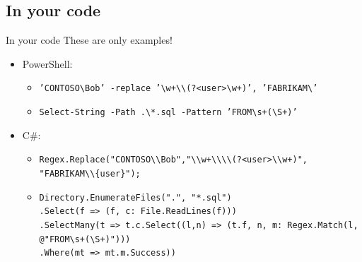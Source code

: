 \documentclass[english,aspectratio=169]{beamer}
\begin{document}
\subsection{In your code}
\begin{frame}{In your code}
These are only examples!
\begin{itemize}
\item PowerShell:
    \begin{itemize}
    \item \texttt{'CONTOSO\textbackslash{}Bob' -replace '\textbackslash{}w+\textbackslash{}\textbackslash{}(?<user>\textbackslash{}w+)', 'FABRIKAM\textbackslash{}\textdollar{}'}
    \item \texttt{Select-String -Path .\textbackslash{}*.sql -Pattern 'FROM\textbackslash{}s+(\textbackslash{}S+)'}
    \end{itemize}
\item C\#:
    \begin{itemize}
    \item \texttt{Regex.Replace("CONTOSO\textbackslash{}\textbackslash{}Bob","\textbackslash{}\textbackslash{}w+\textbackslash{}\textbackslash{}\textbackslash{}\textbackslash{}(?<user>\textbackslash{}\textbackslash{}w+)", "FABRIKAM\textbackslash{}\textbackslash{}\textdollar{}\{user\}");}
    \item \texttt{Directory.EnumerateFiles(".", "*.sql")\\
    .Select(f => (f, c: File.ReadLines(f)))\\
    .SelectMany(t => t.c.Select((l,n) => (t.f, n, m: Regex.Match(l, @"FROM\textbackslash{}s+(\textbackslash{}S+)")))\\
        .Where(mt => mt.m.Success))}
    \end{itemize}
\end{itemize}
\end{frame}
\end{document}
